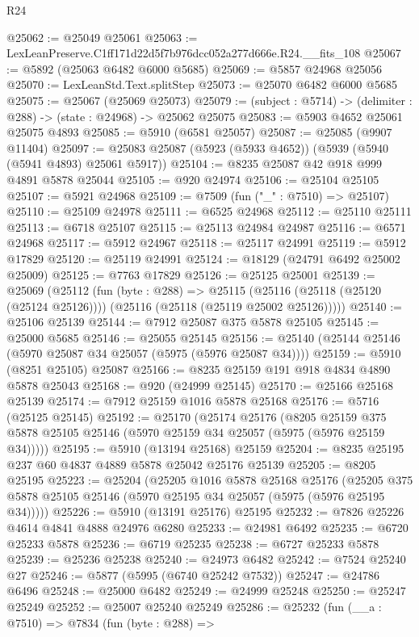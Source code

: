 \begin{lexlean}{R24}
\begin{coremodule}
@25062 := @25049 @25061
@25063 := LexLeanPreserve.C1ff171d22d5f7b976dcc052a277d666e.R24.__fits_108
@25067 := @5892 (@25063 @6482 @6000 @5685)
@25069 := @5857 @24968 @25056
@25070 := LexLeanStd.Text.splitStep
@25073 := @25070 @6482 @6000 @5685
@25075 := @25067 (@25069 @25073)
@25079 := (subject : @5714) -> (delimiter : @288) -> (state : @24968) -> @25062 @25075
@25083 := @5903 @4652 @25061 @25075 @4893
@25085 := @5910 (@6581 @25057)
@25087 := @25085 (@9907 @11404)
@25097 := @25083 @25087 (@5923 (@5933 @4652)) (@5939 (@5940 (@5941 @4893) @25061 @5917))
@25104 := @8235 @25087 @42 @918 @999 @4891 @5878 @25044
@25105 := @920 @24974
@25106 := @25104 @25105
@25107 := @5921 @24968
@25109 := @7509 (fun ("_" : @7510) => @25107)
@25110 := @25109 @24978
@25111 := @6525 @24968
@25112 := @25110 @25111
@25113 := @6718 @25107
@25115 := @25113 @24984 @24987
@25116 := @6571 @24968
@25117 := @5912 @24967
@25118 := @25117 @24991
@25119 := @5912 @17829
@25120 := @25119 @24991
@25124 := @18129 (@24791 @6492 @25002 @25009)
@25125 := @7763 @17829
@25126 := @25125 @25001
@25139 := @25069
    (@25112
      (fun (byte : @288) =>
      @25115 (@25116 (@25118 (@25120 (@25124 @25126)))) (@25116 (@25118 (@25119 @25002 @25126)))))
@25140 := @25106 @25139
@25144 := @7912 @25087 @375 @5878 @25105
@25145 := @25000 @5685
@25146 := @25055 @25145
@25156 := @25140 (@25144 @25146 (@5970 @25087 @34 @25057 (@5975 (@5976 @25087 @34))))
@25159 := @5910 (@8251 @25105) @25087
@25166 := @8235 @25159 @191 @918 @4834 @4890 @5878 @25043
@25168 := @920 (@24999 @25145)
@25170 := @25166 @25168 @25139
@25174 := @7912 @25159 @1016 @5878 @25168
@25176 := @5716 (@25125 @25145)
@25192 := @25170
    (@25174
      @25176
      (@8205 @25159 @375 @5878 @25105 @25146 (@5970 @25159 @34 @25057 (@5975 (@5976 @25159 @34)))))
@25195 := @5910 (@13194 @25168) @25159
@25204 := @8235 @25195 @237 @60 @4837 @4889 @5878 @25042 @25176 @25139
@25205 := @8205 @25195
@25223 := @25204
    (@25205
      @1016
      @5878
      @25168
      @25176
      (@25205 @375 @5878 @25105 @25146 (@5970 @25195 @34 @25057 (@5975 (@5976 @25195 @34)))))
@25226 := @5910 (@13191 @25176) @25195
@25232 := @7826 @25226 @4614 @4841 @4888 @24976 @6280
@25233 := @24981 @6492
@25235 := @6720 @25233 @5878
@25236 := @6719 @25235
@25238 := @6727 @25233 @5878
@25239 := @25236 @25238
@25240 := @24973 @6482
@25242 := @7524 @25240 @27
@25246 := @5877 (@5995 (@6740 @25242 @7532))
@25247 := @24786 @6496
@25248 := @25000 @6482
@25249 := @24999 @25248
@25250 := @25247 @25249
@25252 := @25007 @25240 @25249
@25286 := @25232
    (fun (__a : @7510) =>
    @7834
      (fun (byte : @288) =>

\end{coremodule}
\end{lexlean}
